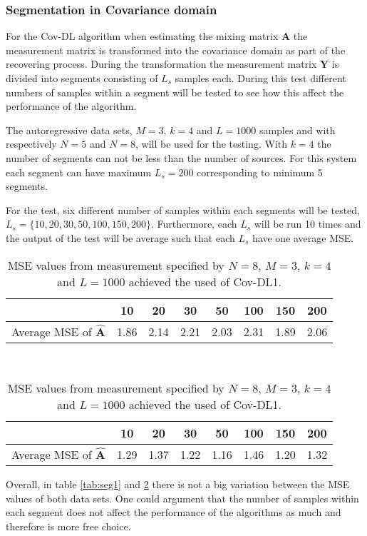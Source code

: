 \subsubsection{Segmentation in Covariance domain}
For the Cov-DL algorithm when estimating the mixing matrix $\mathbf{A}$ the measurement matrix is transformed into the covariance domain as part of the recovering process. During the transformation the measurement matrix $\mathbf{Y}$ is divided into segments consisting of $L_s$ samples each.
During this test different numbers of samples within a segment will be tested to see how this affect the performance of the algorithm.

The autoregressive data sets,  $M = 3$, $k = 4$ and $L = 1000$ samples and with respectively $N = 5$ and $N=8$, will be used for the testing. With $k = 4$ the number of segments can not be less than the number of sources. For this system each segment can have maximum $L_s = 200$ corresponding to minimum 5 segments. 

For the test, six different number of samples within each segments will be tested, $L_s = \{ 10, 20, 30, 50, 100, 150, 200 \}$. Furthermore, each $L_s$ will be run 10 times and the output of the test will be average such that each $L_s$ have one average MSE.

\begin{table}[H]
\centering
\begin{minipage}{.45\textwidth}
\centering
\begin{tabular}{|c|c|c|c|c|c|c|c|}
\hline 
& 10 & 20 & 30 & 50 & 100 & 150 & 200 \\ 
\hline 
Average MSE of $\hat{\mathbf{A}}$ & 1.86 & 2.14 & 2.21 & 2.03 & 2.31 & 1.89 & 2.06 \\ 
\hline
\end{tabular} 
\caption{MSE values from measurement specified by $N=5$, $M = 3$, $k = 4$ and $L = 1000$ achieved from the used of Cov-DL2}
\label{tab:seg1}
\end{minipage}
\\
\begin{minipage}{.45\textwidth}
\centering
\begin{tabular}{|c|c|c|c|c|c|c|c|}
\hline 
& 10 & 20 & 30 & 50 & 100 & 150 & 200 \\ 
\hline 
Average MSE of $\hat{\mathbf{A}}$ & 1.29 & 1.37 & 1.22 & 1.16 & 1.46 & 1.20 & 1.32 \\ 
\hline
\end{tabular} 
\caption{MSE values from measurement specified by $N=8$, $M = 3$, $k = 4$ and $L = 1000$ achieved the used of Cov-DL1.}
\label{tab:seg2}
\end{minipage}
\end{table}
\noindent
Overall, in table \ref{tab:seg1} and \ref{tab:seg2} there is not a big variation between the MSE values of both data sets. One could argument that the number of samples within each segment does not affect the performance of the algorithms as much and therefore is more free choice.